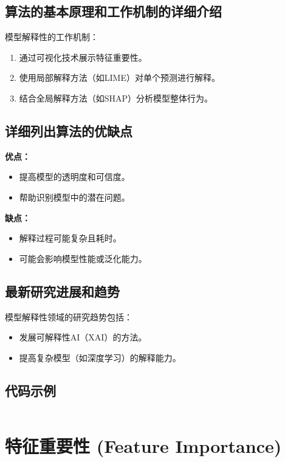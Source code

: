 \subsection*{算法的基本原理和工作机制的详细介绍}
模型解释性的工作机制：
\begin{enumerate}
    \item 通过可视化技术展示特征重要性。
    \item 使用局部解释方法（如LIME）对单个预测进行解释。
    \item 结合全局解释方法（如SHAP）分析模型整体行为。
\end{enumerate}

\subsection*{详细列出算法的优缺点}
\textbf{优点：}
\begin{itemize}
    \item 提高模型的透明度和可信度。
    \item 帮助识别模型中的潜在问题。
\end{itemize}

\textbf{缺点：}
\begin{itemize}
    \item 解释过程可能复杂且耗时。
    \item 可能会影响模型性能或泛化能力。
\end{itemize}

\subsection*{最新研究进展和趋势}
模型解释性领域的研究趋势包括：
\begin{itemize}
    \item 发展可解释性AI（XAI）的方法。
    \item 提高复杂模型（如深度学习）的解释能力。
\end{itemize}
\subsection*{代码示例}
\begin{lstlisting}

\end{lstlisting}


\section{特征重要性 (Feature Importance)}
